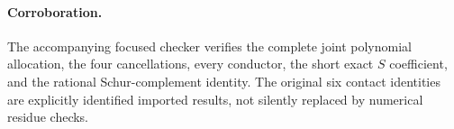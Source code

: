 \paragraph{Corroboration.}
The accompanying focused checker verifies the complete joint polynomial
allocation, the four cancellations, every conductor, the short exact
$S$ coefficient, and the rational Schur-complement identity. The
original six contact identities are explicitly identified imported
results, not silently replaced by numerical residue checks.
